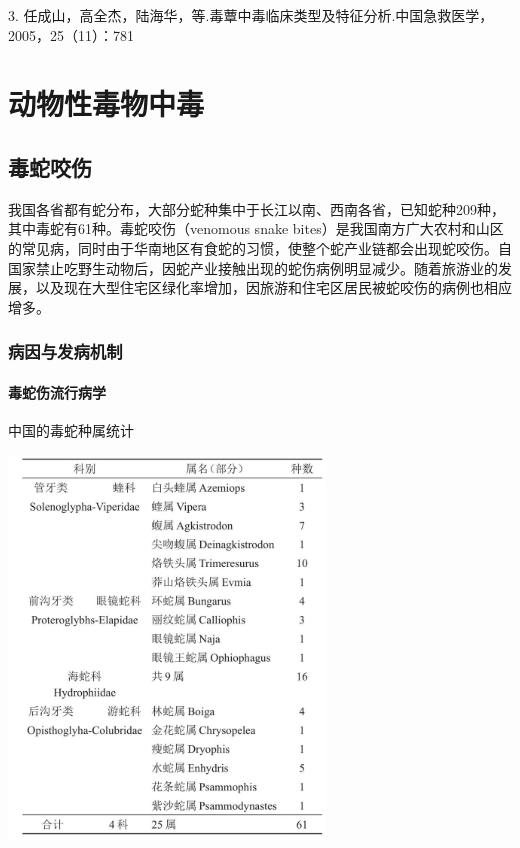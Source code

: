 3.
任成山，高全杰，陆海华，等.毒蕈中毒临床类型及特征分析.中国急救医学，2005，25（11）：781

\protect\hypertarget{text00172.html}{}{}

\chapter{动物性毒物中毒}

\section{毒蛇咬伤}

我国各省都有蛇分布，大部分蛇种集中于长江以南、西南各省，已知蛇种209种，其中毒蛇有61种。毒蛇咬伤（venomous
snake
bites）是我国南方广大农村和山区的常见病，同时由于华南地区有食蛇的习惯，使整个蛇产业链都会出现蛇咬伤。自国家禁止吃野生动物后，因蛇产业接触出现的蛇伤病例明显减少。随着旅游业的发展，以及现在大型住宅区绿化率增加，因旅游和住宅区居民被蛇咬伤的病例也相应增多。

\subsection{病因与发病机制}

\subsubsection{毒蛇伤流行病学}

\begin{table}[htbp]
\centering
\caption{中国的毒蛇种属统计}
\label{tab60-1}
\includegraphics[width=3.3125in,height=4.01042in]{./images/Image00228.jpg}
\end{table}


